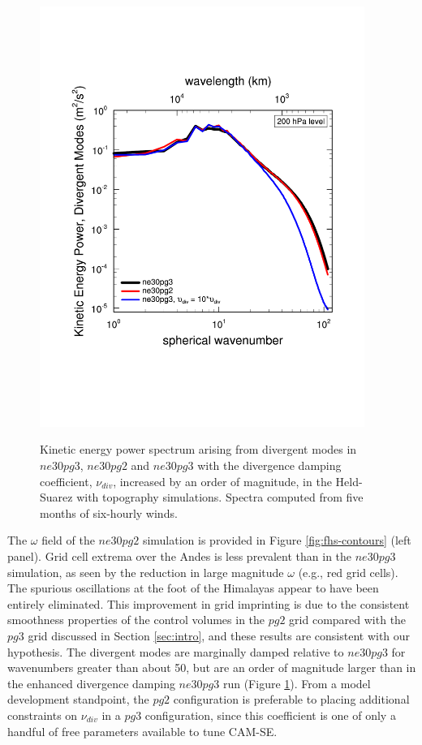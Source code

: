 \documentclass{agujournal}
\begin{document}
\begin{figure}[t]
\begin{center}
\noindent\includegraphics[width=25pc,angle=0]{figs/fhstopo_Divergence_ne30pg2-v-ne30pg3-v-10Xnudiv.pdf}\\
\end{center}
\caption{Kinetic energy power spectrum arising from divergent modes in $ne30pg3$, $ne30pg2$ and $ne30pg3$ with the divergence damping coefficient, $\nu_{div}$, increased by an order of magnitude, in the Held-Suarez with topography simulations. Spectra computed from five months of six-hourly winds.}
\label{fig:fhs-div}
\end{figure}

The $\omega$ field of the $ne30pg2$ simulation is provided in Figure \ref{fig:fhs-contours} (left panel). Grid cell extrema over the Andes is less prevalent than in the $ne30pg3$ simulation, as seen by the reduction in large magnitude $\omega$ (e.g., red grid cells). The spurious oscillations at the foot of the Himalayas appear to have been entirely eliminated. This improvement in grid imprinting is due to the consistent smoothness properties of the control volumes in the $pg2$ grid compared with the $pg3$ grid discussed in Section \ref{sec:intro}, and these results are consistent with our hypothesis. The divergent modes are marginally damped relative to $ne30pg3$ for wavenumbers greater than about 50, but are an order of magnitude larger than in the enhanced divergence damping $ne30pg3$ run (Figure \ref{fig:fhs-div}). From a model development standpoint, the $pg2$ configuration is preferable to placing additional constraints on $\nu_{div}$ in a $pg3$ configuration, since this coefficient is one of only a handful of free parameters available to tune CAM-SE.
\end{document}
